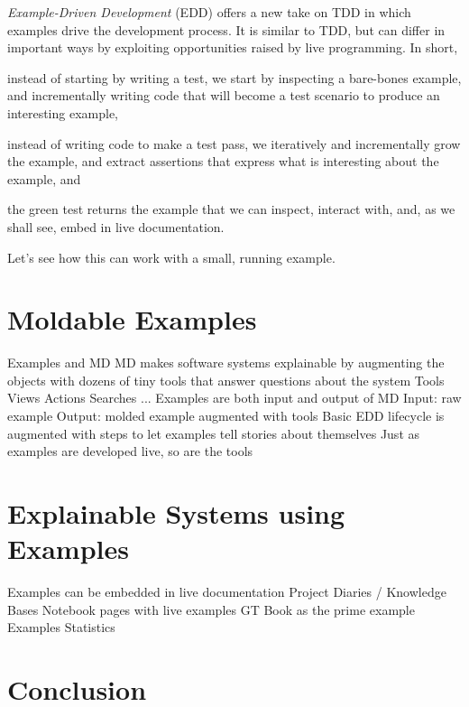 \documentclass[sigplan,anonymous,review,10pt]{acmart}
\begin{document}
\emph{Example-Driven Development} (EDD) offers a new take on TDD in which examples drive the development process.
It is similar to TDD, but can differ in important ways by exploiting opportunities raised by live programming.
In short,
\begin{inparaenum}[(i)]
	\item instead of starting by writing a test, we start by inspecting a bare-bones example, and incrementally writing code that will become a test scenario to produce an interesting example,
	\item instead of writing code to make a test pass, we iteratively and incrementally grow the example, and extract assertions that express what is interesting about the example,
and
	\item the green test returns the example that we can inspect, interact with, and, as we shall see, embed in live documentation.
\end{inparaenum}

Let's see how this can work with a small, running example.


\section{Moldable Examples}\label{sec:moldable}

	Examples and MD
		MD makes software systems explainable by augmenting the objects with dozens of tiny tools that answer questions about the system
			Tools
				Views
				Actions
				Searches
				...
		Examples are both input and output of MD
			Input: raw example
			Output: molded example augmented with tools
		Basic EDD lifecycle is augmented with steps to let examples tell stories about themselves
		Just as examples are developed live, so are the tools

\section{Explainable Systems using Examples}\label{sec:explainable}

	
		Examples can be embedded in live documentation
		Project Diaries / Knowledge Bases
			Notebook pages with live examples
		GT Book as the prime example
			Examples
			Statistics


\section{Conclusion}\label{sec:conclusion}





\end{document}
